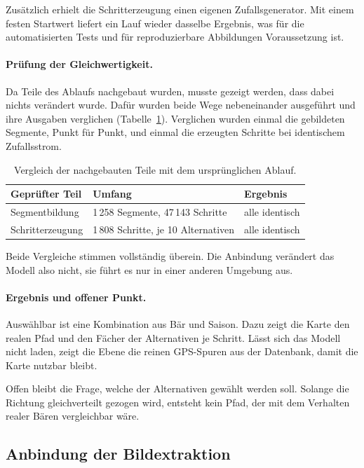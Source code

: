 \documentclass[12pt,a4paper]{report}
\begin{document}
  Zusätzlich erhielt die Schritterzeugung einen eigenen Zufallsgenerator. Mit einem festen Startwert liefert ein Lauf wieder dasselbe
  Ergebnis, was für die automatisierten Tests und für reproduzierbare Abbildungen Voraussetzung ist.

  \paragraph{Prüfung der Gleichwertigkeit.} Da Teile des Ablaufs nachgebaut
  wurden, musste gezeigt werden, dass dabei nichts verändert wurde. Dafür wurden
  beide Wege nebeneinander ausgeführt und ihre Ausgaben verglichen
  (Tabelle~\ref{tab:gleichwertigkeit}). Verglichen wurden einmal die gebildeten
  Segmente, Punkt für Punkt, und einmal die erzeugten Schritte bei identischem
  Zufallsstrom.

  \begin{table}[htbp]
  \centering
  \caption{Vergleich der nachgebauten Teile mit dem ursprünglichen Ablauf.}
  \label{tab:gleichwertigkeit}
  \begin{tabular}{lll}
  \toprule
  Geprüfter Teil & Umfang & Ergebnis \\
  \midrule
  Segmentbildung   & 1\,258 Segmente, 47\,143 Schritte & alle identisch \\
  Schritterzeugung & 1\,808 Schritte, je 10 Alternativen & alle identisch \\
  \bottomrule
  \end{tabular}
  \end{table}

  Beide Vergleiche stimmen vollständig überein. Die Anbindung verändert das
  Modell also nicht, sie führt es nur in einer anderen Umgebung aus.

  \paragraph{Ergebnis und offener Punkt.} Auswählbar ist eine Kombination aus Bär und Saison. Dazu zeigt die Karte den
realen Pfad und den Fächer der Alternativen je Schritt. Lässt sich das Modell
  nicht laden, zeigt die Ebene die reinen GPS-Spuren aus der Datenbank, damit die
  Karte nutzbar bleibt.

  Offen bleibt die Frage, welche der Alternativen gewählt werden soll. Solange die
Richtung gleichverteilt gezogen wird, entsteht kein Pfad, der mit dem Verhalten realer Bären
  vergleichbar wäre.

\subsection{Anbindung der Bildextraktion}
\label{subsec:anbindung}
\end{document}
